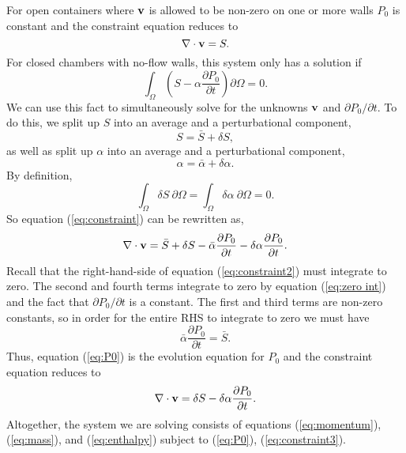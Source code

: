 \documentclass[final]{siamltex}
\def\vb {{\bf v}}
\begin{document}
For open containers where $\vb$ is allowed to be non-zero on one or more walls $P_0$
is constant and the constraint equation reduces to
\begin{equation}
\nabla\cdot\vb = S.
\end{equation}
For closed chambers with no-flow walls, this system only has a solution if
\begin{equation}
\int_{\Omega} \left(S - \alpha\frac{\partial P_0}{\partial t}\right)\partial\Omega = 0.
\end{equation}
We can use this fact to simultaneously solve for the unknowns
$\vb$ and $\partial P_0/\partial t$.
To do this, we split up $S$ into an average and a perturbational component,
\begin{equation}
S = \bar{S} + \delta S,
\end{equation}
as well as split up $\alpha$ into an average and a perturbational component,
\begin{equation}
\alpha = \bar{\alpha} + \delta\alpha.
\end{equation}
By definition,
\begin{equation}
\int_{\Omega} \delta S ~\partial\Omega = \int_{\Omega} \delta \alpha ~\partial\Omega = 0.\label{eq:zero int}
\end{equation}
So equation (\ref{eq:constraint}) can be rewritten as,
\begin{equation}
\nabla\cdot\vb = \bar{S} + \delta S - \bar{\alpha}\frac{\partial P_0}{\partial t} - \delta\alpha\frac{\partial P_0}{\partial t}.\label{eq:constraint2}
\end{equation}
Recall that the right-hand-side of equation (\ref{eq:constraint2}) must integrate to zero.
The second and fourth terms integrate to zero by equation (\ref{eq:zero int}) and 
the fact that $\partial P_0/\partial t$ is a constant.
The first and third terms are non-zero constants,
so in order for the entire RHS to integrate to zero we must have
\begin{equation}
\bar{\alpha}\frac{\partial P_0}{\partial t} = \bar{S}.\label{eq:P0}
\end{equation}
Thus, equation (\ref{eq:P0}) is the evolution equation for $P_0$ and the constraint equation reduces to
\begin{equation}
\nabla\cdot\vb = \delta S - \delta\alpha\frac{\partial P_0}{\partial t}.\label{eq:constraint3}
\end{equation}
Altogether, the system we are solving consists of equations (\ref{eq:momentum}),  (\ref{eq:mass}), and (\ref{eq:enthalpy})
subject to (\ref{eq:P0}), (\ref{eq:constraint3}).
\end{document}
